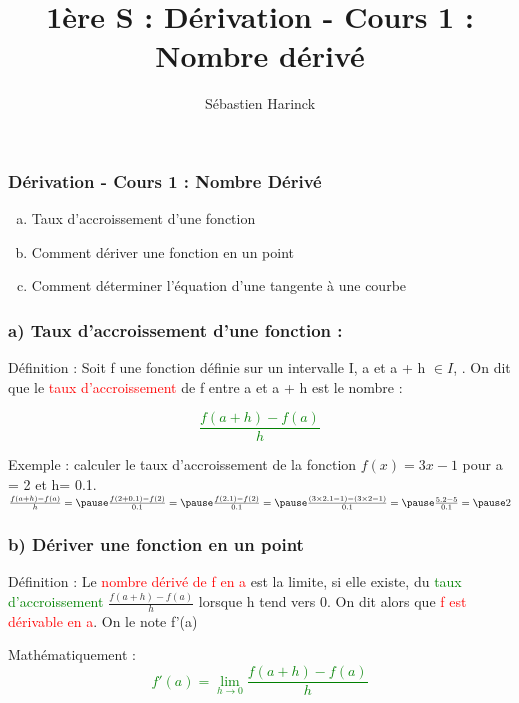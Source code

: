 \documentclass[t]{beamer}
\title{1ère S : Dérivation - Cours 1 : Nombre dérivé}
\author{Sébastien Harinck}
\institute{www.cours-futes.com}
\date{}
\begin{document}
\begin{frame}
\frametitle{Dérivation - Cours 1 : Nombre Dérivé}
\begin{enumerate}[a)]
\item Taux d'accroissement d'une fonction
\item Comment dériver une fonction en un point
\item Comment déterminer l'équation d'une tangente à une courbe
\end{enumerate}
\end{frame}

\begin{frame}[label=pagebanale]
\frametitle{a)  Taux d'accroissement d'une fonction : }
\pause
\begin{block}{Définition :}
\pause
Soit f une fonction définie sur un intervalle I, \pause a et a + h $ \in I$, \pause. 
On dit que le \textcolor{red}{taux d'accroissement} de f \pause entre a et a + h \pause est le nombre : 
\pause
\end{block}
\begin{block}
{\Huge \textcolor{green}{\[\frac{f(a+h) - f(a)}{h}\]}}
\end{block}
\pause
\begin{exampleblock}{Exemple :}
calculer le taux d'accroissement \pause
de la fonction $f(x)=3x -1$ \pause 
pour a = 2 et h= 0.1.
\( \frac{f(a+h) - f(a)}{h} = \pause
\frac{f(2+0.1) - f(2)}{0.1} = \pause 
\frac{f(2.1) - f(2)}{0.1} = \pause
\frac{(3 \times 2.1 - 1) - (3 \times 2 - 1)}{0.1} = \pause
\frac{ 5.2 - 5}{0.1} = \pause
2
\)
\end{exampleblock}
\end{frame}

\begin{frame}[label=pagebanale]
\frametitle{b) Dériver une fonction en un point}
\pause
\begin{block}{Définition :}
\pause
Le \textcolor{red}{nombre dérivé de f en a} est la limite, \pause si elle existe, \pause du \textcolor{green}{taux d'accroissement} \pause
\(\frac{f(a+h) - f(a)}{h}\)
\pause
lorsque h tend vers 0. \pause 
On dit alors que \textcolor{red}{f est dérivable en a}. \pause On le note f'(a)
\pause
\end{block}
\begin{block}{Mathématiquement :}
\pause
{\Huge \textcolor{green}{\[ f'(a) = \lim\limits_{h \rightarrow 0}\frac{f(a+h) - f(a)}{h}\]}}
\end{block}
\end{frame}
\end{document}
